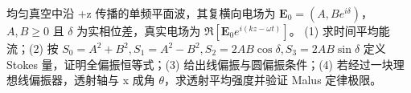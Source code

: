 均匀真空中沿 +z 传播的单频平面波，其复横向电场为 \(\boldsymbol E_0=(A,B e^{i\delta})\)，\(A,B\ge 0\) 且 \(\delta \) 为实相位差，真实电场为 \(\Re[\boldsymbol E_0e^{i(kz-\omega t)}]\)。
(1) 求时间平均能流；(2) 按 \(S_0=A^2+B^2,S_1=A^2-B^2,S_2=2AB\cos\delta,S_3=2AB\sin\delta\) 定义 Stokes 量，证明全偏振恒等式；(3) 给出线偏振与圆偏振条件；(4) 若经过一块理想线偏振器，透射轴与 x 成角 \(\theta \)，求透射平均强度并验证 Malus 定律极限。
